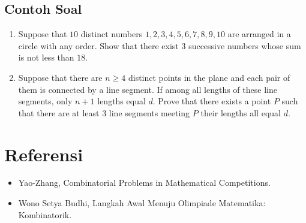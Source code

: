 \documentclass[11pt]{scrartcl}
\begin{document}
\subsection{Contoh Soal}
\begin{enumerate}
\item Suppose that $10$ distinct numbers $1, 2, 3, 4, 5, 6, 7,8, 9, 10$ are arranged in a circle with any order. Show that there exist $3$ successive numbers whose sum is not less than $18$.

\item Suppose that there are $n \ge 4$ distinct points in the plane and each pair of them is connected by a line segment. If among all lengths of these line segments, only $n + 1$ lengths equal $d$. Prove that there exists a point $P$ such that there are at least $3$ line segments meeting $P$ their lengths all equal $d$.

\end{enumerate}
\section{Referensi}
\begin{itemize}
    \item Yao-Zhang, Combinatorial Problems in Mathematical Competitions.
    \item Wono Setya Budhi, Langkah Awal Menuju Olimpiade Matematika: Kombinatorik.
\end{itemize}
\end{document}
